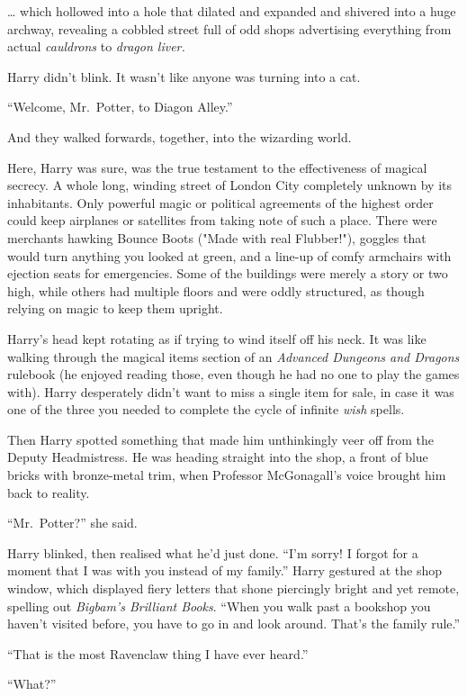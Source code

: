 … which hollowed into a hole that dilated and expanded and
shivered into a huge archway, revealing a cobbled street full of
odd shops advertising everything from actual \emph{cauldrons} to
\emph{dragon liver.}

Harry didn’t blink. It wasn’t like anyone was turning into a cat.

“Welcome, Mr.~Potter, to Diagon Alley.”

And they walked forwards, together, into the wizarding world.

Here, Harry was sure, was the true testament to the
effectiveness of magical secrecy. A whole long, winding
street of London City completely unknown by its
inhabitants. Only powerful magic or political agreements of
the highest order could keep airplanes or satellites from
taking note of such a place. There were merchants hawking
Bounce Boots ("Made with real Flubber!"),
goggles that would turn anything you looked at green, and
a line-up of comfy armchairs with ejection seats for
emergencies. Some of the buildings were merely a story
or two high, while others had multiple floors and were
oddly structured, as though relying on magic to keep them upright.

Harry’s head kept rotating as if trying to wind itself off his
neck. It was like walking through the magical items section of an
\emph{Advanced Dungeons and Dragons} rulebook (he enjoyed
reading those, even though he had no one
to play the games with). Harry desperately didn’t want to miss a
single item for sale, in case it was one of the three you needed to complete
the cycle of infinite \emph{wish} spells.

Then Harry spotted something that made him unthinkingly
veer off from the Deputy Headmistress.
He was heading straight into the shop, a front of blue bricks
with bronze-metal trim, when Professor McGonagall’s voice
brought him back to reality.

“Mr.~Potter?” she said.

Harry blinked, then realised what he’d just done. “I’m sorry! I forgot for a
moment that I was with you instead of my family.” Harry gestured at the shop
window, which displayed fiery letters that shone piercingly bright and yet
remote, spelling out \emph{Bigbam’s Brilliant Books}. “When you walk past a
bookshop you haven’t visited before, you have to go in and look around. That’s
the family rule.”

“That is the most Ravenclaw thing I have ever heard.”

“What?”

